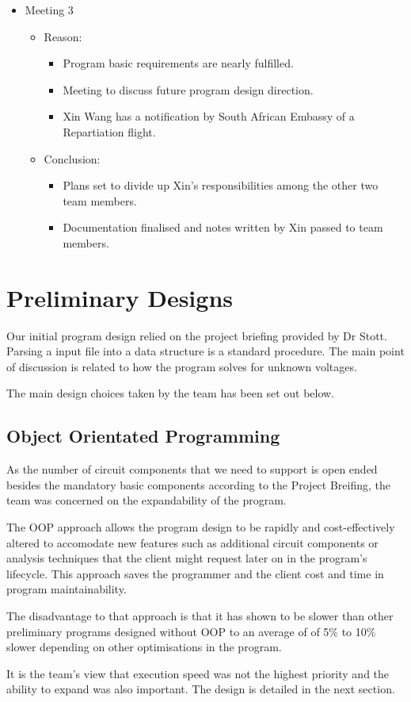 \documentclass[12pt,a4paper]{article}
\begin{document}
\begin{itemize}
\begin{itemize}
\begin{itemize}
			\end{itemize}
		\end{itemize}
		\item Meeting 3
		\begin{itemize}
			\item Reason:
			\begin{itemize}
				\item Program basic requirements are nearly fulfilled. 
				\item Meeting to discuss future program design direction.
				\item Xin Wang has a notification by South African Embassy of a Repartiation flight.
			\end{itemize}
			\item Conclusion:
			\begin{itemize}
				\item Plans set to divide up Xin's responsibilities among the other two team members.
				\item Documentation finalised and notes written by Xin passed to team members.
			\end{itemize}
		\end{itemize}
	\end{itemize}
	\pagebreak

	

\section{Preliminary Designs}
Our initial program design relied on the project briefing provided by Dr Stott. Parsing a input file into a data 
structure is a standard procedure. The main point of discussion is related to how the program solves for unknown voltages.
\par
The main design choices taken by the team has been set out below.
	\subsection{Object Orientated Programming}
	As the number of circuit components that we need to support is open ended besides the mandatory basic components 
	according to the Project Breifing, the team was concerned on the expandability of the program.
	\par
	The OOP approach allows the program design to be rapidly and cost-effectively altered to accomodate new features
	such as additional circuit components or analysis techniques \cite{OOP} that the client might request later on in the 
	program's lifecycle. This approach saves the programmer and the client cost and time in program maintainability.
	\par
	The disadvantage to that approach is that it has shown to be slower than other preliminary programs designed 
	without OOP to an average of of 5\% to 10\% slower depending on other optimisations in the program.
	\par 
	It is the team's view that execution speed was not the highest priority and the ability to expand was also 
	important. The design is detailed in the next section.
\end{document}
